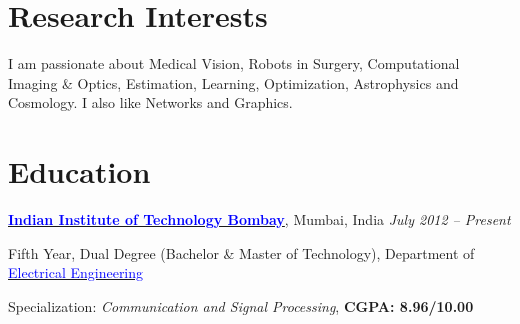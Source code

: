 \documentclass[margin,line]{res}
\newenvironment{list1}{
  \begin{list}{\ding{113}}{%
      \setlength{\itemsep}{0in}
      \setlength{\parsep}{0in} \setlength{\parskip}{0in}
      \setlength{\topsep}{0in} \setlength{\partopsep}{0in} 
      \setlength{\leftmargin}{0.17in}}}{\end{list}}
\begin{document}

\begin{resume}


\section{\sc Research Interests}
I am passionate about Medical Vision, Robots in Surgery, Computational Imaging \& Optics, Estimation, Learning, Optimization, Astrophysics and Cosmology. I also like Networks and Graphics.

\vspace*{-0.13in}

\section{\sc Education}
{\bf \href{http://www.iitb.ac.in/}{\textcolor{blue}{Indian Institute of Technology Bombay}}}, Mumbai, India \hfill {\it July 2012 -- Present} \\
\vspace*{-.1in}
\begin{list1}
\item[] Fifth Year, Dual Degree (Bachelor \& Master of Technology), Department of \href{http://www.ee.iitb.ac.in/}{\textcolor{blue}{Electrical Engineering}}
\item[] Specialization: {\em Communication and Signal Processing}, {\bf CGPA: 8.96/10.00}
\end{list1}


\end{resume}
\end{document}
